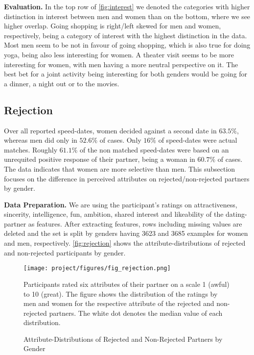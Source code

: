 \documentclass{article}
\begin{document}
\textbf{Evaluation.} In the top row of \autoref{fig:interest} we denoted the categories with higher distinction in interest between men and women than on the bottom, where we see higher overlap.
Going shopping is right/left skewed for men and women, respectively, being a category of interest with the highest distinction in the data. Most men seem to be not in favour of going shopping, which is also true for doing yoga, being also less interesting for women. A theater visit seems to be more interesting for women, with men having a more neutral perspective on it.
The best bet for a joint activity being interesting for both genders would be going for a dinner, a night out or to the movies.

\subsection{Rejection} \label{sec:rejection}
Over all reported speed-dates, women decided against a second date in $63.5\%$, whereas men did only in $52.6\%$ of cases. Only $16\%$ of speed-dates were actual matches. Roughly $61.1\%$ of the non matched speed-dates were based on an unrequited positive response of their partner, being a woman in $60.7\%$ of cases. The data indicates that women are more selective than men. This subsection focuses on the difference in perceived attributes on rejected/non-rejected partners by gender.

 \textbf{Data Preparation.} We are using the participant's ratings on attractiveness, sincerity, intelligence, fun, ambition, shared interest and likeability of the dating-partner as features. 
After extracting features, rows including missing values are deleted and the set is split by genders having 3623 and 3685 examples for women and men, respectively.
 \autoref{fig:rejection} shows the attribute-distributions of rejected and non-rejected participants by gender.

\begin{figure}[ht]
\centering
\texttt{[image: project/figures/fig\_rejection.png]}
\caption{Attribute-Distributions of Rejected and Non-Rejected Partners by Gender}
\label{fig:rejection}
\small Participants rated six attributes of their partner on a scale 1 (awful) to 10 (great). The figure shows the distribution of the ratings by men and women for the respective attribute of the rejected and non-rejected partners. The white dot denotes the median value of each distribution. 
\end{figure}
\end{document}
